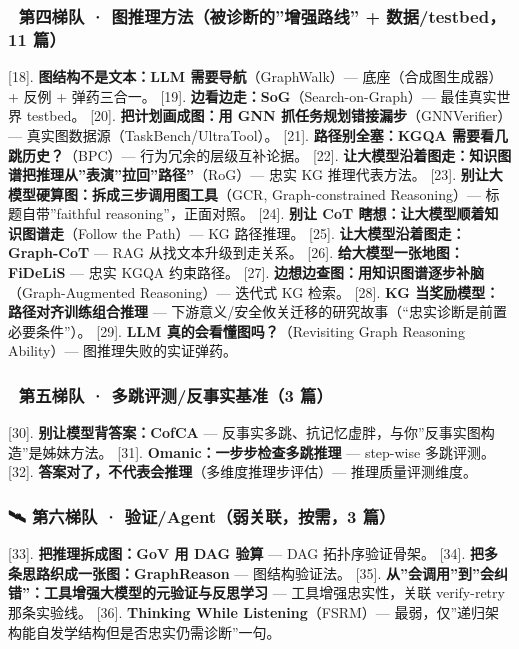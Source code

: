 \documentclass[
  11pt,
]{article}
\begin{document}
\subsubsection{🧭 第四梯队 · 图推理方法（被诊断的''增强路线'' +
数据/testbed，11
篇）}\label{ux7b2cux56dbux68afux961f-ux56feux63a8ux7406ux65b9ux6cd5ux88abux8bcaux65adux7684ux589eux5f3aux8defux7ebf-ux6570ux636etestbed11-ux7bc7}

{[}18{]}. \textbf{图结构不是文本：LLM 需要导航}（GraphWalk）---
底座（合成图生成器）+ 反例 + 弹药三合一。 {[}19{]}.
\textbf{边看边走：SoG}（Search-on-Graph）--- 最佳真实世界 testbed。
{[}20{]}. \textbf{把计划画成图：用 GNN
抓任务规划错接漏步}（GNNVerifier）---
真实图数据源（TaskBench/UltraTool）。 {[}21{]}. \textbf{路径别全塞：KGQA
需要看几跳历史？}（BPC）--- 行为冗余的层级互补论据。 {[}22{]}.
\textbf{让大模型沿着图走：知识图谱把推理从''表演''拉回''路径''}（RoG）---
忠实 KG 推理代表方法。 {[}23{]}.
\textbf{别让大模型硬算图：拆成三步调用图工具}（GCR, Graph-constrained
Reasoning）--- 标题自带''faithful reasoning''，正面对照。 {[}24{]}.
\textbf{别让 CoT 瞎想：让大模型顺着知识图谱走}（Follow the Path）--- KG
路径推理。 {[}25{]}. \textbf{让大模型沿着图走：Graph-CoT} --- RAG
从找文本升级到走关系。 {[}26{]}. \textbf{给大模型一张地图：FiDeLiS} ---
忠实 KGQA 约束路径。 {[}27{]}.
\textbf{边想边查图：用知识图谱逐步补脑}（Graph-Augmented Reasoning）---
迭代式 KG 检索。 {[}28{]}. \textbf{KG 当奖励模型：路径对齐训练组合推理}
--- 下游意义/安全攸关迁移的研究故事（``忠实诊断是前置必要条件''）。
{[}29{]}. \textbf{LLM 真的会看懂图吗？}（Revisiting Graph Reasoning
Ability）--- 图推理失败的实证弹药。

\subsubsection{📐 第五梯队 · 多跳评测/反事实基准（3
篇）}\label{ux7b2cux4e94ux68afux961f-ux591aux8df3ux8bc4ux6d4bux53cdux4e8bux5b9eux57faux51c63-ux7bc7}

{[}30{]}. \textbf{别让模型背答案：CofCA} ---
反事实多跳、抗记忆虚胖，与你''反事实图构造''是姊妹方法。 {[}31{]}.
\textbf{Omanic：一步步检查多跳推理} --- step-wise 多跳评测。 {[}32{]}.
\textbf{答案对了，不代表会推理}（多维度推理步评估）---
推理质量评测维度。

\subsubsection{🛰 第六梯队 · 验证/Agent（弱关联，按需，3
篇）}\label{ux7b2cux516dux68afux961f-ux9a8cux8bc1agentux5f31ux5173ux8054ux6309ux97003-ux7bc7}

{[}33{]}. \textbf{把推理拆成图：GoV 用 DAG 验算} --- DAG
拓扑序验证骨架。 {[}34{]}. \textbf{把多条思路织成一张图：GraphReason}
--- 图结构验证法。 {[}35{]}.
\textbf{从''会调用''到''会纠错''：工具增强大模型的元验证与反思学习} ---
工具增强忠实性，关联 verify-retry 那条实验线。 {[}36{]}.
\textbf{Thinking While Listening}（FSRM）---
最弱，仅''递归架构能自发学结构但是否忠实仍需诊断''一句。
\end{document}
